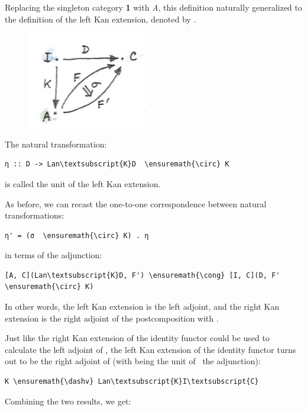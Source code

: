 \noindent
Replacing the singleton category \textbf{1} with \emph{A}, this
definition naturally generalized to the definition of the left Kan
extension, denoted by .

\begin{figure}[H]
\centering
\includegraphics[width=2.06250in]{images/kan12.jpg}
\end{figure}

\noindent
The natural transformation:

\begin{Verbatim}[commandchars=\\\{\}]
η :: D -> Lan\textsubscript{K}D  \ensuremath{\circ} K
\end{Verbatim}
is called the unit of the left Kan extension.

As before, we can recast the one-to-one correspondence between natural
transformations:

\begin{Verbatim}[commandchars=\\\{\}]
η' = (σ  \ensuremath{\circ} K) . η
\end{Verbatim}
in terms of the adjunction:

\begin{Verbatim}[commandchars=\\\{\}]
[A, C](Lan\textsubscript{K}D, F') \ensuremath{\cong} [I, C](D, F'  \ensuremath{\circ} K)
\end{Verbatim}
In other words, the left Kan extension is the left adjoint, and the
right Kan extension is the right adjoint of the postcomposition with
.

Just like the right Kan extension of the identity functor could be used
to calculate the left adjoint of , the left Kan extension of
the identity functor turns out to be the right adjoint of 
(with  being the unit of~ the adjunction):

\begin{Verbatim}[commandchars=\\\{\}]
K \ensuremath{\dashv} Lan\textsubscript{K}I\textsubscript{C}
\end{Verbatim}
Combining the two results, we get:

